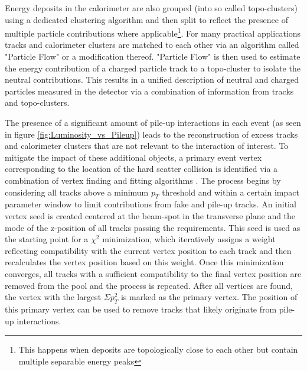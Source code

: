 Energy deposits in the calorimeter are also grouped (into so called topo-clusters) using a dedicated clustering 
algorithm and then split to reflect the presence of multiple particle contributions where applicable\footnote{This 
happens when deposits are topologically close to each other but contain multiple separable energy peaks}. For many 
practical applications tracks and calorimeter clusters are matched to each other via an algorithm called "Particle 
Flow" \cite{atlas-pflow} or a modification thereof. "Particle Flow" is then used to estimate the energy contribution 
of a charged particle track to a topo-cluster to isolate the neutral contributions. This results in a unified 
description of neutral and charged particles measured in the detector via a combination of information from tracks 
and topo-clusters. \par

The presence of a significant amount of pile-up interactions in each event (as seen in figure 
\ref{fig:Luminosity_vs_Pileup}) leads to the reconstruction of excess tracks and calorimeter clusters that are not 
relevant to the interaction of interest. To mitigate the impact of these additional objects, a primary event vertex 
corresponding to the location of the hard scatter collision is identified via a combination of vertex finding and 
fitting algorithms \cite{atlas-vertex-reconstruction}. The process begins by considering all tracks above a minimum 
$p_T$ threshold and within a certain impact parameter window to limit contributions from fake and pile-up tracks. 
An initial vertex seed is created centered at the beam-spot in the transverse plane and the mode of the z-position 
of all tracks passing the requirements. This seed is used as the starting point for a $\chi^2$ minimization, which 
iteratively assigns a weight reflecting compatibility with the current vertex position to each track and then 
recalculates the vertex position based on this weight. Once this minimization converges, all tracks with a sufficient 
compatibility to the final vertex position are removed from the pool and the process is repeated. After all vertices 
are found, the vertex with the largest $\Sigma p_T^2$ is marked as the primary vertex. The position of this primary 
vertex can be used to remove tracks that likely originate from pile-up interactions. \par

